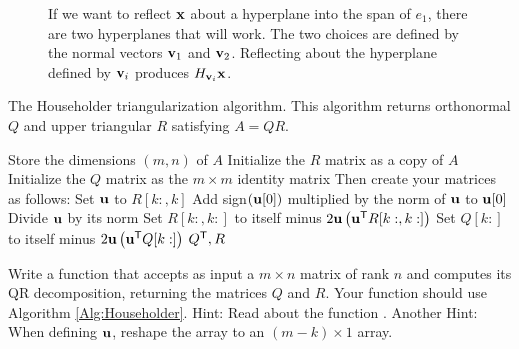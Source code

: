 \begin{figure}
\caption{If we want to reflect ${\bf x}$ about a hyperplane into the span of $e_1$, there are two hyperplanes that will work. 
The two choices are defined by the normal vectors ${\bf v}_1$ and ${\bf v}_2$. 
Reflecting about the hyperplane defined by ${\bf v}_i$ produces  $H_{{\bf v}_i}{\bf x}$.}
\label{fig:two reflectors}
\end{figure}

\begin{algorithm}
\caption{The Householder triangularization algorithm. 
This algorithm returns orthonormal $Q$ and upper triangular $R$ satisfying $A = QR$.}
\label{Alg:Householder}
\begin{algorithmic}[1]
\State Store the dimensions $(m,n)$ of $A$
\State Initialize the $R$ matrix as a copy of $A$
\State Initialize the $Q$ matrix as the $m\times m$ identity matrix
\State Then create your matrices as follows:
    \State Set ${\bf u}$ to $R[k:,k]$
    \State Add sign$({\bf u}[0])$ multiplied by the norm of ${\bf u}$ to ${\bf u}[0]$
    \State Divide ${\bf u}$ by its norm
    \State Set $R[k:,k:]$ to itself minus $2 {\bf u} \left({\bf u}^{\mathsf T} R[k:,k:] \right)$
    \State Set $Q[k:]$ to itself minus $2 {\bf u} \left( {\bf u}^{\mathsf T} Q[k:] \right)$
\EndFor
\State {} $Q^{\mathsf T}, R$
\EndProcedure
\end{algorithmic}
\end{algorithm}


\begin{problem}
\label{prob:HouseholderQR}
Write a function that accepts as input a $m \times n$ matrix of rank $n$ and computes its QR decomposition, returning the matrices $Q$ and $R$. 
Your function should use Algorithm \ref{Alg:Householder}. 
Hint: Read about the function .  Another Hint: When defining ${\bf u}$, reshape the array to an $(m-k) \times 1$ array.
\end{problem}

